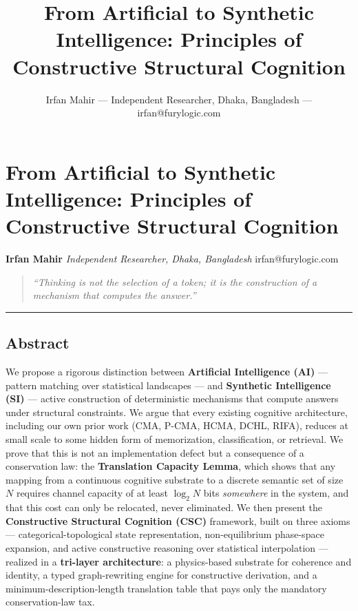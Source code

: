 \documentclass[
  11pt,
  a4paper,
]{article}
\title{From Artificial to Synthetic Intelligence: Principles of
Constructive Structural Cognition}
\author{Irfan Mahir --- Independent Researcher, Dhaka, Bangladesh ---
irfan@furylogic.com}
\date{}
\begin{document}
\maketitle

{
\hypersetup{linkcolor=}
\setcounter{tocdepth}{3}
\tableofcontents
}
\section{From Artificial to Synthetic Intelligence: Principles of
Constructive Structural
Cognition}\label{from-artificial-to-synthetic-intelligence-principles-of-constructive-structural-cognition}

\textbf{Irfan Mahir} \emph{Independent Researcher, Dhaka, Bangladesh}
irfan@furylogic.com

\begin{quote}
\emph{``Thinking is not the selection of a token; it is the construction
of a mechanism that computes the answer.''}
\end{quote}

\begin{center}\rule{0.5\linewidth}{0.5pt}\end{center}

\subsection{Abstract}\label{abstract}

We propose a rigorous distinction between \textbf{Artificial
Intelligence (AI)} --- pattern matching over statistical landscapes ---
and \textbf{Synthetic Intelligence (SI)} --- active construction of
deterministic mechanisms that compute answers under structural
constraints. We argue that every existing cognitive architecture,
including our own prior work (CMA, P-CMA, HCMA, DCHL, RIFA), reduces at
small scale to some hidden form of memorization, classification, or
retrieval. We prove that this is not an implementation defect but a
consequence of a conservation law: the \textbf{Translation Capacity
Lemma}, which shows that any mapping from a continuous cognitive
substrate to a discrete semantic set of size \(N\) requires channel
capacity of at least \(\log_2 N\) bits \emph{somewhere} in the system,
and that this cost can only be relocated, never eliminated. We then
present the \textbf{Constructive Structural Cognition (CSC)} framework,
built on three axioms --- categorical-topological state representation,
non-equilibrium phase-space expansion, and active constructive reasoning
over statistical interpolation --- realized in a \textbf{tri-layer
architecture}: a physics-based substrate for coherence and identity, a
typed graph-rewriting engine for constructive derivation, and a
minimum-description-length translation table that pays only the
mandatory conservation-law tax.
\end{document}

